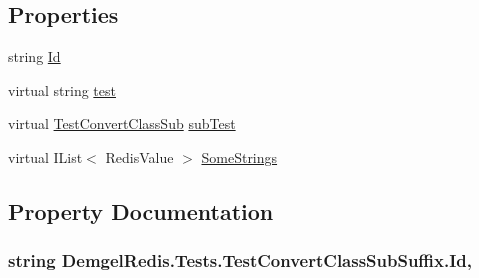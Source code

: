 \subsection*{Properties}
\begin{DoxyCompactItemize}
\item 
string \hyperlink{class_demgel_redis_1_1_tests_1_1_test_convert_class_sub_suffix_a69a93c293bb301d6ef331d42110bf82a}{Id}
\item 
virtual string \hyperlink{class_demgel_redis_1_1_tests_1_1_test_convert_class_sub_suffix_a4b3c5ca04c0f2317d4ab3d2428cc637c}{test}
\item 
virtual \hyperlink{class_demgel_redis_1_1_tests_1_1_test_convert_class_sub}{Test\+Convert\+Class\+Sub} \hyperlink{class_demgel_redis_1_1_tests_1_1_test_convert_class_sub_suffix_a8b6d0f2b429ab9a46c5fbf965e089722}{sub\+Test}
\item 
virtual I\+List$<$ Redis\+Value $>$ \hyperlink{class_demgel_redis_1_1_tests_1_1_test_convert_class_sub_suffix_a037ae9e7b5b90b57c0c6456209a70e62}{Some\+Strings}
\end{DoxyCompactItemize}


\subsection{Property Documentation}
\hypertarget{class_demgel_redis_1_1_tests_1_1_test_convert_class_sub_suffix_a69a93c293bb301d6ef331d42110bf82a}{}
\subsubsection[{Id}]{\setlength{\rightskip}{0pt plus 5cm}string Demgel\+Redis.\+Tests.\+Test\+Convert\+Class\+Sub\+Suffix.\+Id\hspace{0.3cm}{\ttfamily [get]}, {\ttfamily [set]}}\label{class_demgel_redis_1_1_tests_1_1_test_convert_class_sub_suffix_a69a93c293bb301d6ef331d42110bf82a}
\hypertarget{class_demgel_redis_1_1_tests_1_1_test_convert_class_sub_suffix_a037ae9e7b5b90b57c0c6456209a70e62}{}
